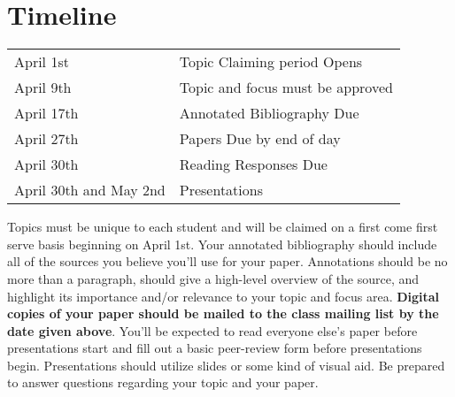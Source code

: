\documentclass[]{tufte-handout}
\begin{document}
\section{Timeline}

\begin{table}[ht]
\centering
\begin{tabular}{ll}
April 1st & Topic Claiming period Opens \\
April 9th & Topic and focus must be approved \\
April 17th & Annotated Bibliography Due \\
April 27th & Papers Due by end of day\\
April 30th & Reading Responses Due \\
April 30th and May 2nd & Presentations \\
\end{tabular}

Topics must be unique to each student and will be claimed on a first come first serve basis beginning on April 1st. Your annotated bibliography should include all of the sources you believe you'll use for your paper. Annotations should be no more than a paragraph, should give a high-level overview of the source, and highlight its importance and/or relevance to your topic and focus area.  \textbf{Digital copies of your paper should be mailed to the class mailing list by the date given above}.  You'll be expected to read everyone else's paper before presentations start and fill out a basic peer-review form before presentations begin. Presentations should utilize slides or some kind of visual aid. Be prepared to answer questions regarding your topic and your paper.
\end{table}
\end{document}
